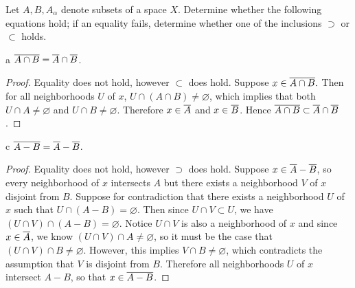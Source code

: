 \documentclass[11pt]{article}
\begin{document}



\begin{ex}{8}
  Let $A, B, A_\alpha$ denote subsets of a space $X$. Determine whether the
  following equations hold; if an equality fails, determine whether one of the
  inclusions $\supset$ or $\subset$ holds.
\end{ex}

\begin{p}{a}
  ${ \overline{A \cap B} } = { \overline{A} } \cap { \overline{B} }$.
\end{p}

\begin{proof}
  Equality does not hold, however $\subset$ does hold. Suppose $x \in { \overline{A \cap
  B} }.$ Then for all neighborhoods $U$ of $x$, $U \cap (A \cap B) \neq
  \varnothing$, which implies that both $U \cap A \neq \varnothing$ and $U \cap
  B \neq \varnothing$. Therefore $x \in { \overline{A} }$ and $x \in { \overline{B} }$. Hence ${ \overline{A
  \cap B} } \subset { \overline{A} } \cap { \overline{B} }$.
\end{proof}

\begin{p}{c}
  ${ \overline{A - B} } = { \overline{A} } - { \overline{B} }$.
\end{p}
\begin{proof}
  Equality does not hold, however $\supset$ does hold. Suppose $x \in { \overline{A} } -
  { \overline{B} }$, so every neighborhood of $x$ intersects $A$ but there exists a
  neighborhood $V$ of $x$ disjoint from $B$. Suppose for contradiction that
  there exists a neighborhood $U$ of $x$ such that $U \cap (A - B) =
  \varnothing$. Then since $U \cap V \subset U$, we have $(U \cap V) \cap (A -
  B) = \varnothing$. Notice $U \cap V$ is also a neighborhood of $x$ and since $x \in { \overline{A} }$, we know $(U
  \cap V) \cap A \neq \varnothing$, so it must be the case that $(U \cap V) \cap
  B \neq \varnothing$. However, this implies $V \cap B \neq \varnothing$, which
  contradicts the assumption that $V$ is disjoint from $B$. Therefore all
  neighborhoods $U$ of $x$ intersect $A - B$, so that $x \in { \overline{A - B} }$.
\end{proof}
\end{document}
